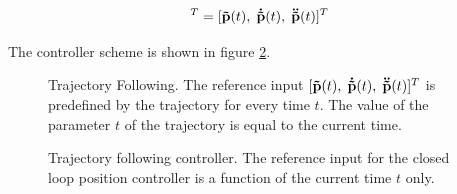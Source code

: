\begin{equation}
  [{\bf{r}}_{ref}(t), \; {\bf\dot{r}}_{ref}(t), \; {\bf\ddot{r}}_{ref}(t)]^T = [{\bf\tilde{p}}(t), \; {\bf\dot{\tilde{p}}}(t), \; {\bf\ddot{\tilde{p}}}(t)]^T
\end{equation}

The controller scheme is shown in figure \ref{fig:trajectoryfollowing}. 

\begin{figure}[H]
    \centering
    \def\svgwidth{0.4\columnwidth}
    
    \caption{Trajectory Following. The reference input $[{\bf\tilde{p}}(t), \; {\bf\dot{\tilde{p}}}(t), \; {\bf\ddot{\tilde{p}}}(t)]^T$ is predefined by the trajectory for every time $t$. The value of the parameter $t$ of the trajectory is equal to the current time.}
    \label{fig:scene_trajectoryFollowing}
\end{figure}

\begin{figure}[H]
    \centering
    \def\svgwidth{\columnwidth}
    
    \caption{Trajectory following controller. The reference input for the closed loop position controller is a function of the current time $t$ only.}
    \label{fig:trajectoryfollowing}
\end{figure}




